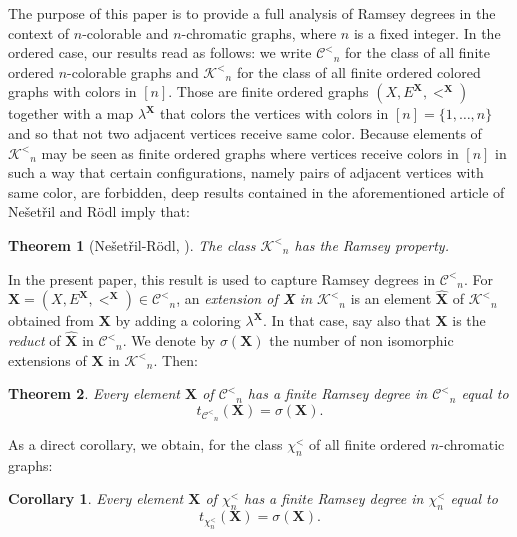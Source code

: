 \documentclass[reqno]{amsart}
\newtheorem{thm}{Theorem}
\newtheorem{cor}{Corollary}
\begin{document}
The purpose of this paper is to provide a full analysis of Ramsey degrees in the context of $n$-colorable and $n$-chromatic graphs, where $n$ is a fixed integer. In the ordered case, our results read as follows: we write ${\mathcal{C}^<} _n$ for the class of all finite ordered $n$-colorable graphs and ${\mathcal{K}^<} _n$ for the class of all finite ordered colored graphs with colors in $[n]$. Those are finite ordered graphs $(X, E^{{\textbf{{X}}}}, <^{{\textbf{{X}}}})$ together with a map $\lambda^{{\textbf{{X}}}}$ that colors the vertices with colors in $[n]=\{1,\ldots, n \}$ and so that not two adjacent vertices receive same color. Because elements of ${\mathcal{K}^<} _n$ may be seen as finite ordered graphs where vertices receive colors in $[n]$ in such a way that certain configurations, namely pairs of adjacent vertices with same color, are forbidden, deep results contained in the aforementioned article of Ne\v set\v ril and R\"odl \cite{NR} imply that: 

\begin{thm}[Ne\v set\v ril-R\"odl, \cite{NR}]
\label{thm:RoK}
The class ${\mathcal{K}^<} _n$ has the Ramsey property.
\end{thm}

In the present paper, this result is used to capture Ramsey degrees in ${\mathcal{C}^<} _n$. For ${\textbf{{X}}}=(X, E^{{\textbf{{X}}}}, <^{{\textbf{{X}}}}) \in {\mathcal{C}^<} _n$, an \emph{extension of {\textbf{{X}}} in ${\mathcal{K}^<} _n$} is an element ${\widehat{\textbf{{X}}}}$ of ${\mathcal{K}^<} _n$ obtained from ${\textbf{{X}}}$ by adding a coloring $\lambda^{{\textbf{{X}}}}$. In that case, say also that ${\textbf{{X}}}$ is the \emph{reduct} of ${\widehat{\textbf{{X}}}}$ in ${\mathcal{C}^<} _n$. We denote by $\sigma({\textbf{{X}}})$ the number of non isomorphic extensions of ${\textbf{{X}}}$ in ${\mathcal{K}^<} _n$. Then: 

\begin{thm}
\label{thm:RdoC}
Every element ${\textbf{{X}}}$ of ${\mathcal{C}^<} _n$ has a finite Ramsey degree in ${\mathcal{C}^<} _n$ equal to \[ t_{{\mathcal{C}^<} _n}({\textbf{{X}}})=\sigma({\textbf{{X}}}).\]
\end{thm}

As a direct corollary, we obtain, for the class $\chi ^< _n$ of all finite ordered $n$-chromatic graphs: 

\begin{cor}
\label{thm:Rdochi}
Every element ${\textbf{{X}}}$ of $\chi ^< _n$ has a finite Ramsey degree in $\chi ^< _n$ equal to \[ t_{\chi ^< _n}({\textbf{{X}}})=\sigma({\textbf{{X}}}).\]
\end{cor}
\end{document}
